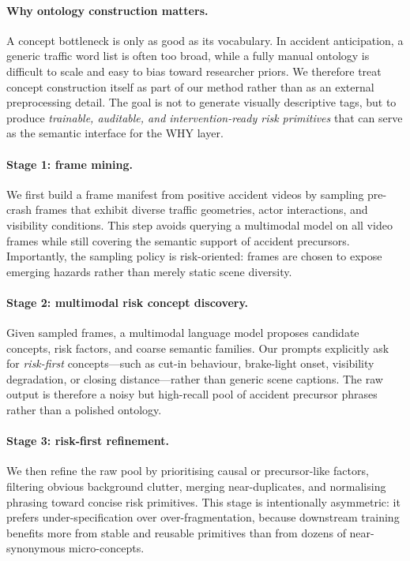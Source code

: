 \paragraph{Why ontology construction matters.}
A concept bottleneck is only as good as its vocabulary.
In accident anticipation, a generic traffic word list is often too broad,
while a fully manual ontology is difficult to scale and easy to bias toward
researcher priors. We therefore treat concept construction itself as part of
our method rather than as an external preprocessing detail. The goal is not to
generate visually descriptive tags, but to produce \emph{trainable,
auditable, and intervention-ready risk primitives} that can serve as the
semantic interface for the WHY layer.

\paragraph{Stage 1: frame mining.}
We first build a frame manifest from positive accident videos by sampling
pre-crash frames that exhibit diverse traffic geometries, actor interactions,
and visibility conditions. This step avoids querying a multimodal model on all
video frames while still covering the semantic support of accident precursors.
Importantly, the sampling policy is risk-oriented: frames are chosen to expose
emerging hazards rather than merely static scene diversity.

\paragraph{Stage 2: multimodal risk concept discovery.}
Given sampled frames, a multimodal language model proposes candidate concepts,
risk factors, and coarse semantic families. Our prompts explicitly ask for
\emph{risk-first} concepts---such as cut-in behaviour, brake-light onset,
visibility degradation, or closing distance---rather than generic scene
captions. The raw output is therefore a noisy but high-recall pool of accident
precursor phrases rather than a polished ontology.

\paragraph{Stage 3: risk-first refinement.}
We then refine the raw pool by prioritising causal or precursor-like factors,
filtering obvious background clutter, merging near-duplicates, and normalising
phrasing toward concise risk primitives. This stage is intentionally asymmetric:
it prefers under-specification over over-fragmentation, because downstream
training benefits more from stable and reusable primitives than from dozens of
near-synonymous micro-concepts.


